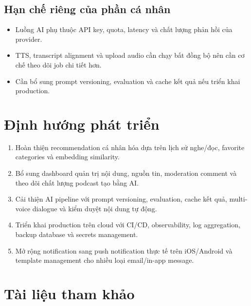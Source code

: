 \documentclass[14pt,a4paper,oneside]{extreport}
\begin{document}
\subsection{Hạn chế riêng của phần cá nhân}

\begin{itemize}[leftmargin=2cm]
  \item Luồng AI phụ thuộc API key, quota, latency và chất lượng phản hồi của provider.
  \item TTS, transcript alignment và upload audio cần chạy bất đồng bộ nên cần cơ chế theo dõi job chi tiết hơn.
  \item Cần bổ sung prompt versioning, evaluation và cache kết quả nếu triển khai production.
\end{itemize}

\section{Định hướng phát triển}
\label{sec:dinh-huong}

\begin{enumerate}[leftmargin=2cm]
  \item Hoàn thiện recommendation cá nhân hóa dựa trên lịch sử nghe/đọc, favorite categories và embedding similarity.
  \item Bổ sung dashboard quản trị nội dung, nguồn tin, moderation comment và theo dõi chất lượng podcast tạo bằng AI.
  \item Cải thiện AI pipeline với prompt versioning, evaluation, cache kết quả, multi-voice dialogue và kiểm duyệt nội dung tự động.
  \item Triển khai production trên cloud với CI/CD, observability, log aggregation, backup database và secrets management.
  \item Mở rộng notification sang push notification thực tế trên iOS/Android và template management cho nhiều loại email/in-app message.
\end{enumerate}

\section{Tài liệu tham khảo}
\label{sec:tai-lieu-tham-khao}
\end{document}
